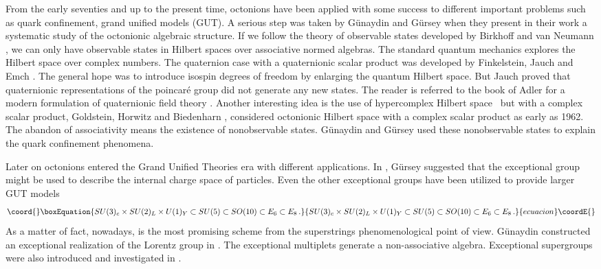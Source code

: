 \documentclass[a4paper,12pt]{book}
\begin{document}
From the early seventies and up to the present time, octonions have been
applied with some success to different important problems such as quark
confinement, grand unified models (GUT). A serious step was taken by
G\"{u}naydin and G\"{u}rsey \cite{c10}\cite{c10a} when they present in their
work a systematic study of the octonionic algebraic structure. If we follow
the theory of observable states developed by Birkhoff and van Neumann \cite
{c11}, we can only have observable states in Hilbert spaces over associative
normed algebras. The standard quantum mechanics explores the Hilbert space
over complex numbers. The quaternion case with a quaternionic scalar product
was developed by Finkelstein, Jauch and Emch \cite{c12}. The general hope
was to introduce isospin degrees of freedom by enlarging the quantum Hilbert
space. But Jauch proved that quaternionic representations of the
poincar\'{e} group did not generate any new states. The reader is referred
to the book of Adler for a modern formulation of quaternionic field theory 
\cite{adler}. Another interesting idea is the use of hypercomplex Hilbert
space \ but with a complex scalar product, Goldstein, Horwitz and Biedenharn 
\cite{c13}, considered octonionic Hilbert space with a complex scalar
product as early as 1962. The abandon of associativity means the existence
of nonobservable states. G\"{u}naydin and G\"{u}rsey used these
nonobservable states to explain the quark confinement phenomena.

Later on octonions entered the Grand Unified Theories era with different
applications. In \cite{c14}, G\"{u}rsey suggested that the exceptional group 
\coordHE{} might be used to describe the internal charge space of particles.
Even the other exceptional groups \coordHE{} have been utilized to
provide larger GUT models \cite{e6e7} 
\begin{equation}\coord{}\boxEquation{
SU(3)_{c}\times SU(2)_{L}\times U(1)_{Y}\subset SU(5)\subset SO(10)\subset
E_{6}\subset E_{8}\,.
}{
SU(3)_{c}\times SU(2)_{L}\times U(1)_{Y}\subset SU(5)\subset SO(10)\subset
E_{6}\subset E_{8}\,.
}{ecuacion}\coordE{}\end{equation}
As a matter of fact, nowadays, \coordHE{} is the most
promising scheme from the superstrings phenomenological point of view.
G\"{u}naydin constructed an exceptional realization of the Lorentz group in 
\cite{c15}. The exceptional \coordHE{} multiplets generate
a non-associative algebra. Exceptional supergroups were also introduced and
investigated in \cite{c15}.
\end{document}

